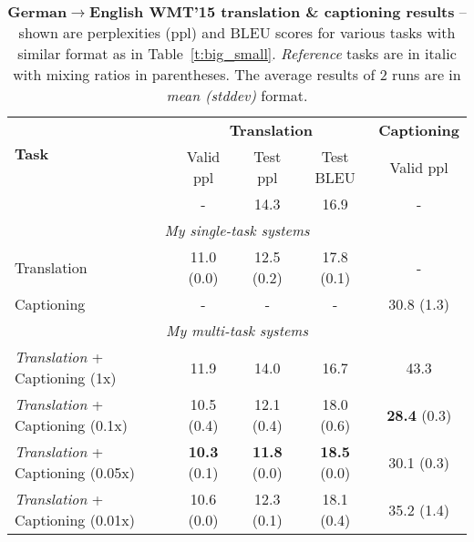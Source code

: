 \begin{table}[tbh!]
\centering
\begin{tabular}{l|c|c|c|c}
\multirow{ 2}{*}{\bf{Task}} & \multicolumn{3}{c|}{{\bf Translation}} &
\multicolumn{1}{c}{{\bf
Captioning}}\\
  \cline{2-5}
  & Valid ppl & Test ppl & Test BLEU & Valid ppl \\ %
  \hline
\citep{luong15attn} & - & 14.3 & 16.9 & - \\ %
  \hline
\multicolumn{5}{c}{{\it My single-task systems}} \\
  \hline
Translation & 11.0 (0.0) & 12.5 (0.2) & 17.8 (0.1) & - \\ %
  \hline
Captioning & - & - & - & 30.8 (1.3) \\ %
  \hline
\multicolumn{5}{c}{{\it My multi-task systems}} \\
  \hline
{\it Translation} + Captioning (1x) & 11.9 & 14.0 & 16.7 & 43.3 \\ %
{\it Translation} + Captioning (0.1x) &  10.5 (0.4) & 12.1 (0.4) & 18.0 (0.6) &
{\bf 28.4} (0.3) \\ %
{\it Translation} + Captioning (0.05x) &  {\bf 10.3} (0.1) &  {\bf 11.8} (0.0) &
{\bf 18.5} (0.0) & 30.1 (0.3) \\ %
{\it Translation} + Captioning (0.01x) &  10.6 (0.0) & 12.3 (0.1)& 18.1 (0.4) & 35.2 (1.4)
\\ %
\end{tabular}
\caption[Translation \& captioning results]{{\bf German$\rightarrow$English WMT'15 translation \& captioning results} -- shown are
perplexities (ppl) and BLEU scores 
for various tasks with similar format as
in Table~\ref{t:big_small}. {\it Reference} tasks are in italic with mixing
ratios in parentheses. The average results of 2 runs are in {\it
mean (stddev)} format.} %
\label{t:big_medium}
\end{table}


